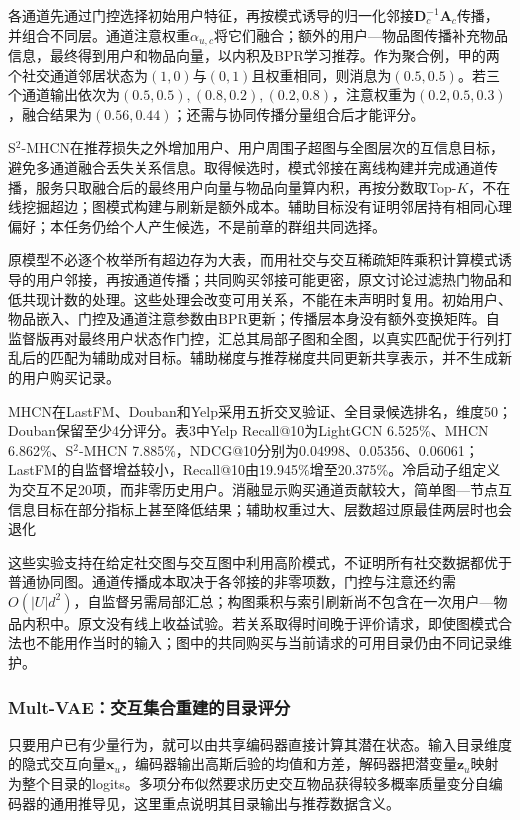 各通道先通过门控选择初始用户特征，再按模式诱导的归一化邻接$\bm D_c^{-1}\bm A_c$传播，并组合不同层。通道注意权重$\alpha_{u,c}$将它们融合；额外的用户—物品图传播补充物品信息，最终得到用户和物品向量，以内积及BPR学习推荐。作为聚合例，甲的两个社交通道邻居状态为$(1,0)$与$(0,1)$且权重相同，则消息为$(0.5,0.5)$。若三个通道输出依次为$(0.5,0.5),(0.8,0.2),(0.2,0.8)$，注意权重为$(0.2,0.5,0.3)$，融合结果为$(0.56,0.44)$；还需与协同传播分量组合后才能评分。

S$^2$-MHCN在推荐损失之外增加用户、用户周围子超图与全图层次的互信息目标，避免多通道融合丢失关系信息。取得候选时，模式邻接在离线构建并完成通道传播，服务只取融合后的最终用户向量与物品向量算内积，再按分数取Top-$K$，不在线挖掘超边；图模式构建与刷新是额外成本。辅助目标没有证明邻居持有相同心理偏好；本任务仍给个人产生候选，不是前章的群组共同选择。

原模型不必逐个枚举所有超边存为大表，而用社交与交互稀疏矩阵乘积计算模式诱导的用户邻接，再按通道传播；共同购买邻接可能更密，原文讨论过滤热门物品和低共现计数的处理。这些处理会改变可用关系，不能在未声明时复用。初始用户、物品嵌入、门控及通道注意参数由BPR更新；传播层本身没有额外变换矩阵。自监督版再对最终用户状态作门控，汇总其局部子图和全图，以真实匹配优于行列打乱后的匹配为辅助成对目标。辅助梯度与推荐梯度共同更新共享表示，并不生成新的用户购买记录。

MHCN在LastFM、Douban和Yelp采用五折交叉验证、全目录候选排名，维度50；Douban保留至少4分评分。表3中Yelp Recall@10为LightGCN 6.525\%、MHCN 6.862\%、S$^2$-MHCN 7.885\%，NDCG@10分别为0.04998、0.05356、0.06061；LastFM的自监督增益较小，Recall@10由19.945\%增至20.375\%。冷启动子组定义为交互不足20项，而非零历史用户。消融显示购买通道贡献较大，简单图—节点互信息目标在部分指标上甚至降低结果；辅助权重过大、层数超过原最佳两层时也会退化

这些实验支持在给定社交图与交互图中利用高阶模式，不证明所有社交数据都优于普通协同图。通道传播成本取决于各邻接的非零项数，门控与注意还约需$O(|U|d^2)$，自监督另需局部汇总；构图乘积与索引刷新尚不包含在一次用户—物品内积中。原文没有线上收益试验。若关系取得时间晚于评价请求，即使图模式合法也不能用作当时的输入；图中的共同购买与当前请求的可用目录仍由不同记录维护。

\subsubsection{Mult-VAE：交互集合重建的目录评分}
\label{sec:rs-mult-vae}

只要用户已有少量行为，就可以由共享编码器直接计算其潜在状态。输入目录维度的隐式交互向量$\bm x_u$，编码器输出高斯后验的均值和方差，解码器把潜变量$\bm z_u$映射为整个目录的logits。多项分布似然要求历史交互物品获得较多概率质量变分自编码器的通用推导见，这里重点说明其目录输出与推荐数据含义。

